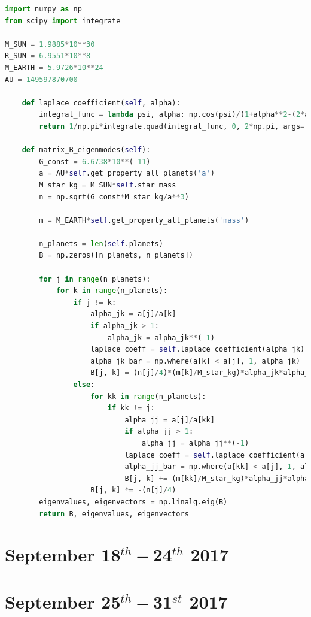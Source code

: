 \documentclass[11pt, oneside]{article}   	%
\begin{document}
\begin{lstlisting}[language=Python, caption={Calculate the frequency matrix, $\mathbf{B}$}]
import numpy as np
from scipy import integrate

M_SUN = 1.9885*10**30
R_SUN = 6.9551*10**8
M_EARTH = 5.9726*10**24
AU = 149597870700

    def laplace_coefficient(self, alpha):
        integral_func = lambda psi, alpha: np.cos(psi)/(1+alpha**2-(2*alpha*np.cos(psi)))**(3./2.)
        return 1/np.pi*integrate.quad(integral_func, 0, 2*np.pi, args=(alpha,))[0]
        
    def matrix_B_eigenmodes(self):
        G_const = 6.6738*10**(-11)
        a = AU*self.get_property_all_planets('a')
        M_star_kg = M_SUN*self.star_mass
        n = np.sqrt(G_const*M_star_kg/a**3)

        m = M_EARTH*self.get_property_all_planets('mass')

        n_planets = len(self.planets)
        B = np.zeros([n_planets, n_planets])

        for j in range(n_planets):
            for k in range(n_planets):
                if j != k:
                    alpha_jk = a[j]/a[k]
                    if alpha_jk > 1:
                        alpha_jk = alpha_jk**(-1)
                    laplace_coeff = self.laplace_coefficient(alpha_jk)
                    alpha_jk_bar = np.where(a[k] < a[j], 1, alpha_jk)
                    B[j, k] = (n[j]/4)*(m[k]/M_star_kg)*alpha_jk*alpha_jk_bar*laplace_coeff
                else:
                    for kk in range(n_planets):
                        if kk != j:
                            alpha_jj = a[j]/a[kk]
                            if alpha_jj > 1:
                                alpha_jj = alpha_jj**(-1)
                            laplace_coeff = self.laplace_coefficient(alpha_jj)
                            alpha_jj_bar = np.where(a[kk] < a[j], 1, alpha_jj)
                            B[j, k] += (m[kk]/M_star_kg)*alpha_jj*alpha_jj_bar*laplace_coeff
                    B[j, k] *= -(n[j]/4)
        eigenvalues, eigenvectors = np.linalg.eig(B)
        return B, eigenvalues, eigenvectors
\end{lstlisting}

\section{September 18$^{th} - $24$^{th}$ 2017}

\newpage


\section{September 25$^{th} - $31$^{st}$ 2017}
\end{document}
